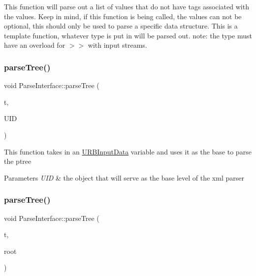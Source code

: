 This function will parse out a list of values that do not have tags associated with the values. Keep in mind, if this function is being called, the values can not be optional, this should only be used to parse a specific data structure. This is a template function, whatever type is put in will be parsed out. note\+: the type must have an overload for $>$$>$ with input streams. \mbox{\label{classParseInterface_a47a3d184a3746c20169383e867e85d3a}} 
\subsubsection{\texorpdfstring{parse\+Tree()}{parseTree()}\hspace{0.1cm}{\footnotesize\ttfamily [1/3]}}
{\footnotesize\ttfamily void Parse\+Interface\+::parse\+Tree (\begin{DoxyParamCaption}\item[{pt\+::ptree}]{t,  }\item[{\hyperlink{classURBInputData}{U\+R\+B\+Input\+Data} $\ast$\&}]{U\+ID }\end{DoxyParamCaption})\hspace{0.3cm}{\ttfamily [static]}}

This function takes in an \hyperlink{classURBInputData}{U\+R\+B\+Input\+Data} variable and uses it as the base to parse the ptree 
\begin{DoxyParams}{Parameters}
{\em U\+ID} & the object that will serve as the base level of the xml parser \\
\hline
\end{DoxyParams}
\mbox{\label{classParseInterface_a40785f4b5636c69df24784ba151716ac}} 
\subsubsection{\texorpdfstring{parse\+Tree()}{parseTree()}\hspace{0.1cm}{\footnotesize\ttfamily [2/3]}}
{\footnotesize\ttfamily void Parse\+Interface\+::parse\+Tree (\begin{DoxyParamCaption}\item[{pt\+::ptree}]{t,  }\item[{\hyperlink{classRoot}{Root} $\ast$\&}]{root }\end{DoxyParamCaption})\hspace{0.3cm}{\ttfamily [static]}}

